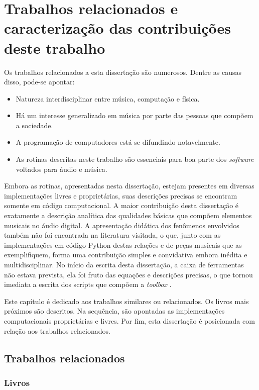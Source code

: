 \chapter{Trabalhos relacionados e caracterização das contribuições deste trabalho}
\label{cap:trabalhosRelacionados}

Os trabalhos relacionados a esta dissertação são numerosos. Dentre as causas disso, pode-se apontar:

\begin{itemize}
    \item Natureza interdisciplinar entre música, computação e física.
    \item Há um interesse generalizado em música por parte das pessoas que compõem a sociedade.
    \item A programação de computadores está se difundindo notavelmente.
    \item As rotinas descritas neste trabalho são essenciais para boa parte dos \emph{software} voltados para áudio e música.
\end{itemize}

Embora as rotinas, apresentadas nesta dissertação, estejam presentes em diversas implementações livres e proprietárias, suas descrições precisas se encontram somente em código computacional. A maior contribuição desta dissertação é exatamente a descrição analítica das qualidades básicas que compõem elementos musicais no áudio digital. A apresentação didática dos fenômenos envolvidos também não foi encontrada na literatura visitada, o que, junto com as implementações em código Python destas relações e de peças musicais que as exemplifiquem, forma uma contribuição simples e convidativa embora inédita e multidisciplinar. No início da escrita desta dissertação, a caixa de ferramentas não estava prevista, ela foi fruto das equações e descrições precisas, o que tornou imediata a escrita dos scripts que compõem a \emph{toolbox} \massa.

Este capítulo é dedicado aos trabalhos similares ou relacionados. Os livros mais próximos são descritos. Na sequência, são apontadas as implementações computacionais proprietárias e livres. Por fim, esta dissertação é posicionada com relação aos trabalhos relacionados.

\section{Trabalhos relacionados}

\subsection{Livros}\label{subsec:livros}

